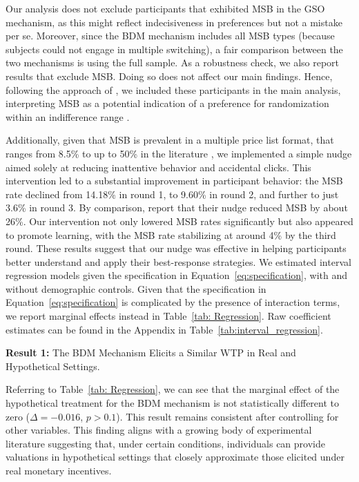 \documentclass[12pt]{article}
\begin{document}
Our analysis does not exclude participants that exhibited MSB in the GSO mechanism, as this might reflect indecisiveness in preferences but not a mistake per se. Moreover, since the BDM mechanism includes all MSB types (because subjects could not engage in multiple switching), a fair comparison between the two mechanisms is using the full sample. As a robustness check, we also report results that exclude MSB. Doing so does not affect our main findings. Hence, following the approach of \citet{brown2018separated}, we included these participants in the main analysis, interpreting MSB as a potential indication of a preference for randomization within an indifference range \citep{agranov2023stable}. 

Additionally, given that MSB is prevalent in a multiple price list format, that ranges from 8.5\%  to up to 50\% in the literature \citep{yu2021multiple, filippin2016reconsideration}, we implemented a simple nudge aimed solely at reducing inattentive behavior and accidental clicks. This intervention led to a substantial improvement in participant behavior: the MSB rate declined from 14.18\% in round 1, to 9.60\% in round 2, and further to just 3.6\% in round 3. By comparison, \citet{yu2021multiple} report that their nudge reduced MSB by about 26\%. Our intervention not only lowered MSB rates significantly but also appeared to promote learning, with the MSB rate stabilizing at around 4\% by the third round. These results suggest that our nudge was effective in helping participants better understand and apply their best-response strategies. We estimated interval regression models given the specification in Equation~\ref{eq:specification}, with and without demographic controls. Given that the specification in Equation~\ref{eq:specification} is complicated by the presence of interaction terms, we report marginal effects instead in Table~\ref{tab: Regression}. Raw coefficient estimates can be found in the Appendix in Table~\ref{tab:interval_regression}.



\textbf{Result 1:} The BDM Mechanism Elicits a Similar WTP in Real and Hypothetical Settings. 

Referring to Table~\ref{tab: Regression}, we can see that the marginal effect of the hypothetical treatment for the BDM mechanism is not statistically different to zero (\(\Delta = -0.016\), \(p > 0.1\)). This result remains consistent after controlling for other variables. This finding aligns with a growing body of experimental literature suggesting that, under certain conditions, individuals can provide valuations in hypothetical settings that closely approximate those elicited under real monetary incentives\citep{branas-garza_paid_2023, drichoutis_incentives_2025}. 
 
\end{document}
